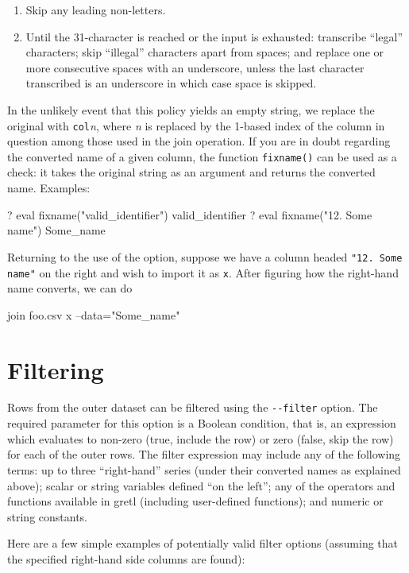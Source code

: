 \begin{enumerate}
\item Skip any leading non-letters.
\item Until the 31-character is reached or the input is exhausted:
  transcribe ``legal'' characters; skip ``illegal'' characters apart
  from spaces; and replace one or more consecutive spaces with an
  underscore, unless the last character transcribed is an underscore
  in which case space is skipped.
\end{enumerate}

In the unlikely event that this policy yields an empty string, we
replace the original with \texttt{col}\textsl{n}, where \textsl{n} is
replaced by the 1-based index of the column in question among those
used in the join operation. If you are in doubt regarding the
converted name of a given column, the function \texttt{fixname()} can
be used as a check: it takes the original string as an argument and
returns the converted name. Examples:

\begin{code}
? eval fixname("valid_identifier")
valid_identifier
? eval fixname("12. Some name")
Some_name
\end{code}

Returning to the use of the  option, suppose we have a
column headed \verb|"12. Some name"| on the right and wish to import
it as \texttt{x}. After figuring how the right-hand name converts, we
can do
%
\begin{code}
join foo.csv x --data="Some_name"
\end{code}

\section{Filtering}
\label{sec:join-filter}

Rows from the outer dataset can be filtered using the \verb|--filter|
option. The required parameter for this option is a Boolean condition,
that is, an expression which evaluates to non-zero (true, include the
row) or zero (false, skip the row) for each of the outer rows. The
filter expression may include any of the following terms: up to three
``right-hand'' series (under their converted names as explained
above); scalar or string variables defined ``on the left''; any of the
operators and functions available in gretl (including user-defined
functions); and numeric or string constants.

Here are a few simple examples of potentially valid filter options
(assuming that the specified right-hand side columns are found):

